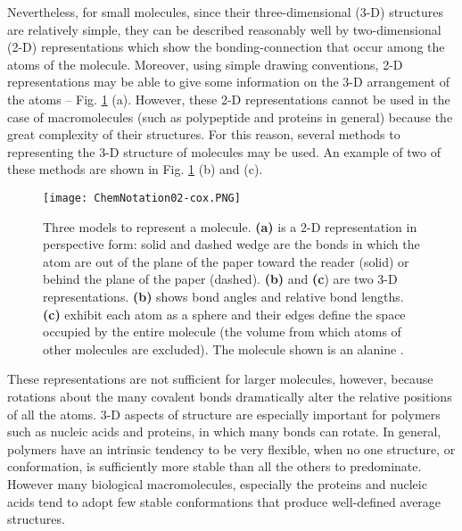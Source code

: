 Nevertheless, for small molecules, since their three-dimensional (3-D) structures are relatively simple, they can be described reasonably well by two-dimensional (2-D) representations which show the bonding-connection that occur among the atoms of the molecule. Moreover, using simple drawing conventions, 2-D representations may be able to give some information on the 3-D arrangement of the atoms -- Fig. \ref{fig:ChemNot} (a).
However, these 2-D representations cannot be used in the case of macromolecules (such as polypeptide and proteins in general) because the great complexity of their structures. For this reason, several methods to representing the 3-D structure of molecules may be used. An example of two of these methods are shown in Fig. \ref{fig:ChemNot} (b) and (c).

\begin{figure}[h]
\centering
\begin{minipage}[t]{0.8\textwidth}
\centering
\texttt{[image: ChemNotation02-cox.PNG]}

\caption{\small{Three models to represent a molecule. \textbf{(a)} is a 2-D representation in perspective form: solid and dashed wedge are the bonds in which the atom are out of the plane of the paper toward the reader (solid) or behind the plane of the paper (dashed). \textbf{(b)} and \textbf{(c}) are two 3-D representations. \textbf{(b)} shows bond angles and relative bond lengths. \textbf{(c)} exhibit each atom as a sphere and their edges define the space occupied by the entire molecule (the volume from which atoms of other molecules are excluded). 
The molecule shown is an alanine
\cite{nelson2008lehninger}.}}

\label{fig:ChemNot}
\end{minipage} 
\end{figure}
These representations are not sufficient for larger molecules, however, because rotations about the many covalent bonds dramatically alter the relative positions of all the atoms. 
3-D aspects of structure are especially important for polymers such as nucleic acids and proteins, in which many bonds can rotate. In general, polymers have an intrinsic tendency to be very flexible, when no one structure, or conformation, is sufficiently more stable than all the others to predominate. However many biological macromolecules, especially the proteins and nucleic acids tend to adopt few stable conformations that produce well-defined average structures.

